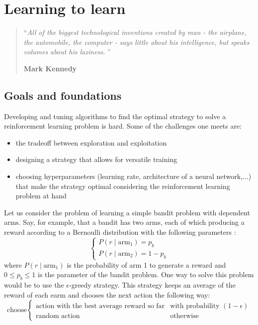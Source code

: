 \chapter{Learning to learn}
\begin{quotation}
\noindent ``\emph{All of the biggest technological inventions created by man -
	the airplane, the automobile, the computer - says little about his 
	intelligence, but speaks volumes about his laziness.  }''
\begin{flushright}\textbf{Mark Kennedy}\end{flushright}
\end{quotation}

\vspace*{0.5cm}

\section{Goals and foundations}
Developing and tuning algorithms to find the optimal strategy to solve a
reinforcement learning problem is hard. Some of the challenges one meets are:
\begin{itemize}
	\item the tradeoff between exploration and exploitation
	\item designing a strategy that allows for versatile training
	\item choosing hyperparameters (learning rate, architecture of a
		neural network,...)  that make the strategy
		optimal considering the reinforcement learning problem at hand
\end{itemize}

Let us consider the problem of learning a simple bandit problem with dependent
arms. Say, for example, that a bandit has two arms, each of which producing
a reward according to a Bernoulli distribution with the following parameters :
$$ \begin{cases} P(r \mid \text{arm}_1) = p_b \\ 
P(r \mid \text{arm}_2) = 1 - p_b  \end{cases} $$
where $P(r \mid \text{arm}_1)$ is the probability of arm 1 to generate a reward
and $0 \leq p_b \leq 1$ is the parameter of the bandit problem. One way to
solve this problem would be to use the $\epsilon$-greedy strategy. 
This
strategy keeps an average of the reward of each earm and chooses the next
action the following way:
$$ \text{choose} \begin{cases}
	\text{action with the best average reward so far} & \text{with probability } (1-\epsilon) 
	\\
	\text{random action} & \text{otherwise}
\end{cases}
$$

